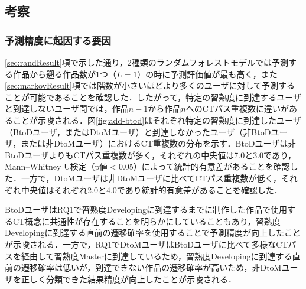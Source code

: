 \documentclass[submit,ses,noauthor]{ipsj}
\begin{document}
\vspace{-5mm}
\subsection{考察}


\subsubsection{予測精度に起因する要因}

\ref{sec:randResult}項で示した通り，2種類のランダムフォレストモデルでは予測する作品から遡る作品数が1つ（$L=1$）の時に予測評価値が最も高く，また\ref{sec:markovResult}項では階数が小さいほどより多くのユーザに対して予測することが可能であることを確認した．したがって，特定の習熟度に到達するユーザと到達しないユーザ間では，作品$n-1$から作品$n$へのCTパス重複数に違いがあることが示唆される．図\ref{fig:add-btod}はそれぞれ特定の習熟度に到達したユーザ（BtoDユーザ，またはDtoMユーザ）と到達しなかったユーザ（非BtoDユーザ，または非DtoMユーザ）におけるCT重複数の分布を示す．BtoDユーザは非BtoDユーザよりもCTパス重複数が多く，それぞれの中央値は7.0と3.0であり，Mann–Whitney U検定（p値$<$0.05）によって統計的有意差があることを確認した．一方で，DtoMユーザは非DtoMユーザに比べてCTパス重複数が低く，それぞれ中央値はそれぞれ2.0と4.0であり統計的有意差があることを確認した．

BtoDユーザはRQ1で習熟度Developingに到達するまでに制作した作品で使用するCT概念に共通性が存在することを明らかにしていることもあり，習熟度Developingに到達する直前の遷移確率を使用することで予測精度が向上したことが示唆される．一方で，RQ1でDtoMユーザはBtoDユーザに比べて多様なCTパスを経由して習熟度Masterに到達しているため，習熟度Developingに到達する直前の遷移確率は低いが，到達できない作品の遷移確率が高いため，非DtoMユーザを正しく分類できた結果精度が向上したことが示唆される．



\end{document}

